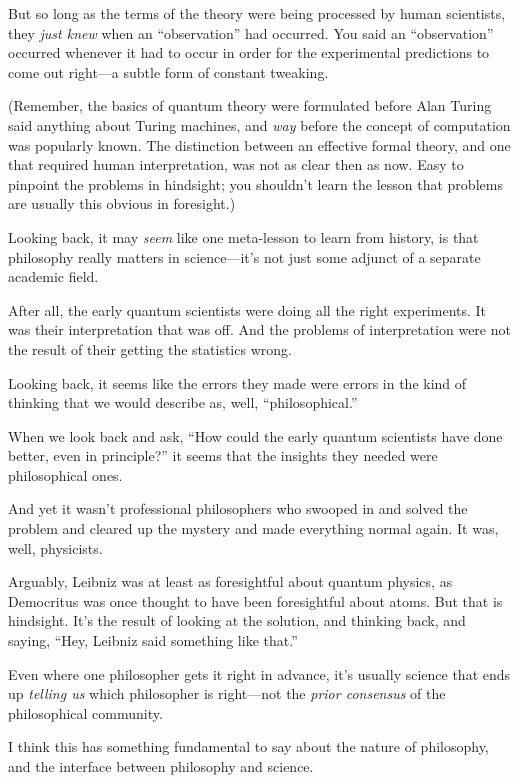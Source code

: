 {
 But so long as the terms of the theory were being processed by
human scientists, they \textit{just knew} when an
``observation'' had occurred. You
said an ``observation'' occurred
whenever it had to occur in order for the experimental predictions to
come out right---a subtle form of constant tweaking.}

{
 (Remember, the basics of quantum theory were formulated before
Alan Turing said anything about Turing machines, and \textit{way}
before the concept of computation was popularly known. The distinction
between an effective formal theory, and one that required human
interpretation, was not as clear then as now. Easy to pinpoint the
problems in hindsight; you shouldn't learn the lesson
that problems are usually this obvious in foresight.)}

{
 Looking back, it may \textit{seem} like one meta-lesson to learn
from history, is that philosophy really matters in
science---it's not just some adjunct of a separate
academic field.}

{
 After all, the early quantum scientists were doing all the right
experiments. It was their interpretation that was off. And the problems
of interpretation were not the result of their getting the statistics
wrong.}

{
 Looking back, it seems like the errors they made were errors in
the kind of thinking that we would describe as, well,
``philosophical.''}

{
 When we look back and ask, ``How could the early
quantum scientists have done better, even in
principle?'' it seems that the insights they needed
were philosophical ones.}

{
 And yet it wasn't professional philosophers who
swooped in and solved the problem and cleared up the mystery and made
everything normal again. It was, well, physicists.}

{
 Arguably, Leibniz was at least as foresightful about quantum
physics, as Democritus was once thought to have been foresightful about
atoms. But that is hindsight. It's the result of
looking at the solution, and thinking back, and saying,
``Hey, Leibniz said something like
that.''}

{
 Even where one philosopher gets it right in advance,
it's usually science that ends up \textit{telling us}
which philosopher is right---not the \textit{prior consensus} of the
philosophical community.}

{
 I think this has something fundamental to say about the nature of
philosophy, and the interface between philosophy and science.}

